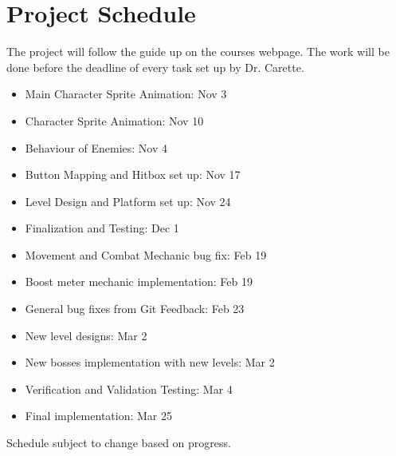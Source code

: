 \documentclass{article}
\begin{document}
	\section{Project Schedule}
	The project will follow the guide up on the courses webpage. The work will be done before the deadline of every task set up by Dr. Carette.\\
	\begin{itemize}
		\item Main Character Sprite Animation: Nov 3
		\item Character Sprite Animation: Nov 10
		\item Behaviour of Enemies: Nov 4
		\item Button Mapping and Hitbox set up: Nov 17
		\item Level Design and Platform set up: Nov 24
		\item Finalization and Testing: Dec 1
		\item Movement and Combat Mechanic bug fix: Feb 19
		\item Boost meter mechanic implementation: Feb 19
		\item General bug fixes from Git Feedback: Feb 23
		\item New level designs: Mar 2
		\item New bosses implementation with new levels: Mar 2 
		\item Verification and Validation Testing: Mar 4
		\item Final implementation: Mar 25
	\end{itemize}
	Schedule subject to change based on progress.
\end{document}
